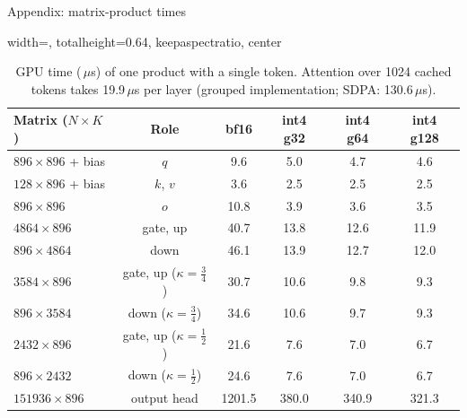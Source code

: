\documentclass[aspectratio=169,10pt]{beamer}
\newcommand{\us}{\,$\mu$s}
\begin{document}
\begin{frame}{Appendix: matrix-product times}{}
\begin{table}
\centering
\begin{adjustbox}{width=\linewidth, totalheight=0.64\textheight, keepaspectratio, center}
\centering
\small
\begin{tabular}{lccccc}
\toprule
Matrix ($N\times K$) & Role & bf16 & int4 g32 & int4 g64 & int4 g128 \\
\midrule
$896\times896$ + bias    & $q$                          & 9.6    & 5.0   & 4.7   & 4.6   \\
$128\times896$ + bias    & $k$, $v$                     & 3.6    & 2.5   & 2.5   & 2.5   \\
$896\times896$           & $o$                          & 10.8   & 3.9   & 3.6   & 3.5   \\
$4864\times896$          & gate, up                     & 40.7   & 13.8  & 12.6  & 11.9  \\
$896\times4864$          & down                         & 46.1   & 13.9  & 12.7  & 12.0  \\
$3584\times896$          & gate, up ($\kappa=\tfrac34$) & 30.7   & 10.6  & 9.8   & 9.3   \\
$896\times3584$          & down ($\kappa=\tfrac34$)     & 34.6   & 10.6  & 9.7   & 9.3   \\
$2432\times896$          & gate, up ($\kappa=\tfrac12$) & 21.6   & 7.6   & 7.0   & 6.7   \\
$896\times2432$          & down ($\kappa=\tfrac12$)     & 24.6   & 7.6   & 7.0   & 6.7   \\
$151936\times896$        & output head                  & 1201.5 & 380.0 & 340.9 & 321.3 \\
\bottomrule
\end{tabular}
\end{adjustbox}
\caption{GPU time (\us) of one product with a single token. Attention over 1024 cached tokens takes
19.9\us{} per layer (grouped implementation; SDPA: 130.6\us).}\label{tab:table}
\end{table}
\end{frame}
\end{document}
